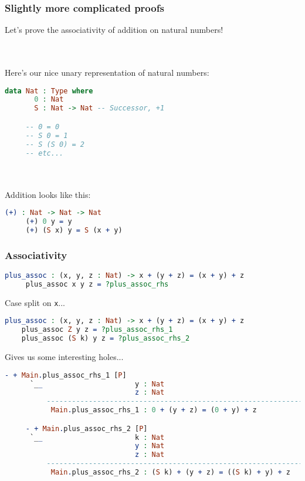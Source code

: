 \documentclass{beamer}
\begin{document}
\begin{frame}[fragile]
  \frametitle{Slightly more complicated proofs}

  Let's prove the associativity of addition on natural numbers!

  \pause \\~\\

  Here's our nice unary representation of natural numbers:

  \begin{lstlisting}[language=Idris]
     data Nat : Type where
       0 : Nat
       S : Nat -> Nat -- Successor, +1

     -- 0 = 0
     -- S 0 = 1
     -- S (S 0) = 2
     -- etc...
   \end{lstlisting}
   
   \pause \\~\\

   Addition looks like this:

   \begin{lstlisting}[language=Idris]
     (+) : Nat -> Nat -> Nat
     (+) 0 y = y
     (+) (S x) y = S (x + y)
   \end{lstlisting}
\end{frame}

\begin{frame}[fragile]
  \frametitle{Associativity}

  \begin{lstlisting}[language=Idris]
     plus_assoc : (x, y, z : Nat) -> x + (y + z) = (x + y) + z
     plus_assoc x y z = ?plus_assoc_rhs
  \end{lstlisting}

  \pause
  Case split on \texttt{x}...
  
  \begin{lstlisting}[language=Idris]
    plus_assoc : (x, y, z : Nat) -> x + (y + z) = (x + y) + z
    plus_assoc Z y z = ?plus_assoc_rhs_1
    plus_assoc (S k) y z = ?plus_assoc_rhs_2
  \end{lstlisting}

  \pause
  Gives us some interesting holes...

  \begin{lstlisting}[language=Idris]
     - + Main.plus_assoc_rhs_1 [P]
      `__                      y : Nat
                               z : Nat
          ---------------------------------------------------------------
           Main.plus_assoc_rhs_1 : 0 + (y + z) = (0 + y) + z

     - + Main.plus_assoc_rhs_2 [P]
      `__                      k : Nat
                               y : Nat
                               z : Nat
          -----------------------------------------------------------------------
           Main.plus_assoc_rhs_2 : (S k) + (y + z) = ((S k) + y) + z
  \end{lstlisting}
\end{frame}
\end{document}
